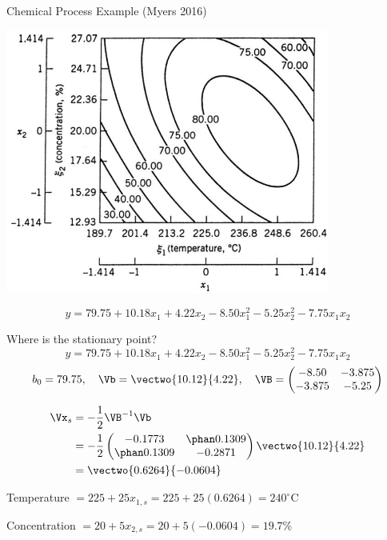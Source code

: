 \documentclass[10pt]{beamer}
\begin{document}
\begin{frame}{Chemical Process Example (Myers 2016)}

\includegraphics[width=0.8\textwidth]{figures/rsm_chemical_contour.png}
	
\[ y = 79.75 + 10.18x_1 + 4.22x_2 - 8.50x_1^2 - 5.25x_2^2 - 7.75x_1x_2 \]
\end{frame}

\begin{frame}{Where is the stationary point?}
\[ y = 79.75 + 10.18x_1 + 4.22x_2 - 8.50x_1^2 - 5.25x_2^2 - 7.75x_1x_2 \]
\pause
\[ b_0=79.75,\quad \Vb=\vectwo{10.12}{4.22},\quad \VB = \begin{pmatrix} -8.50 & -3.875\\-3.875 & -5.25 \end{pmatrix} \]

\pause
\begin{align*}
		\Vx_s &= -\frac{1}{2}\VB^{-1}\Vb \\
		&= -\frac{1}{2}\begin{pmatrix}-0.1773&\phan0.1309\\\phan0.1309&-0.2871\end{pmatrix}\vectwo{10.12}{4.22} \\
		&= \vectwo{0.6264}{-0.0604}
\end{align*}

\pause
\medskip
Temperature $= 225 + 25x_{1,s} = 225+25(0.6264) = 240^\circ$C

\medskip
Concentration $=20 + 5x_{2,s} = 20+5(-0.0604) = 19.7$\%

\end{frame}
\end{document}
